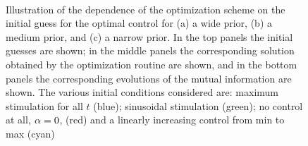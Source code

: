 \documentclass[12pt]{article}
\begin{document}
\begin{figure}[h]
\begin{center}
\\
\caption[Dependence on initial guess for control]{Illustration of the dependence
of the optimization scheme on the initial guess for the optimal
control for (a) a wide prior, (b) a medium prior, and (c) a narrow prior. 
In the top panels the initial guesses are shown; in the middle
panels the corresponding solution obtained by the optimization routine
are shown, and
in the bottom panels the corresponding evolutions of the mutual
information are shown.
The various initial conditions considered are: maximum stimulation for all $t$
(blue); sinusoidal stimulation (green); no control at all, ${\alpha}=0$, (red) and a
linearly increasing control from min to max (cyan)}
\label{fig:ICs_for_control}
\end{center}
\end{figure}
\end{document}
